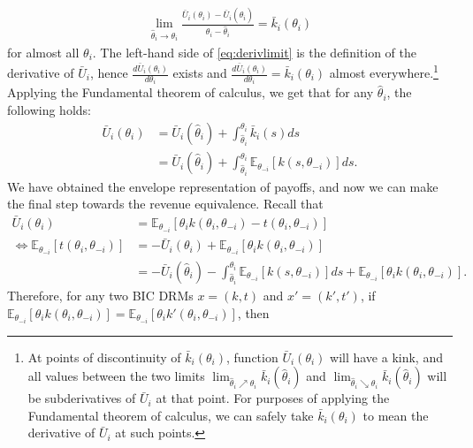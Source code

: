 \documentclass[a4paper]{article}
\begin{document}
	\begin{align}
		\lim_{\hat{\theta}_i \to \theta_i} \frac{\bar{U}_i(\theta_i) - \bar{U}_i(\hat{\theta}_i)}{\theta_i - \hat{\theta}_i} = \bar{k}_i(\theta_i)
		\label{eq:derivlimit}
	\end{align}
	for almost all $\theta_i$.
	The left-hand side of \eqref{eq:derivlimit} is the definition of the derivative of $\bar{U}_i$, hence $\frac{d\bar{U}_i(\theta_i)}{d \theta_i}$ exists and $\frac{d\bar{U}_i(\theta_i)}{d \theta_i} = \bar{k}_i(\theta_i)$ almost everywhere.\footnote{At points of discontinuity of $\bar{k}_i(\theta_i)$, function $\bar{U}_i(\theta_i)$ will have a kink, and all values between the two limits $\lim_{\hat{\theta}_i \nearrow \theta_i} \bar{k}_i(\hat{\theta}_i)$ and $\lim_{\hat{\theta}_i \searrow \theta_i} \bar{k}_i(\hat{\theta}_i)$ will be subderivatives of $\bar{U}_i$ at that point. For purposes of applying the Fundamental theorem of calculus, we can safely take $\bar{k}_i(\theta_i)$ to mean the derivative of $\bar{U}_i$ at such points.}
	Applying the Fundamental theorem of calculus, we get that for any $\hat{\theta}_i$, the following holds:
	\begin{align}
		\bar{U}_i(\theta_i) &= \bar{U}_i(\hat{\theta}_i) + \int_{\hat{\theta}_i}^{\theta_i} \bar{k}_i(s) ds
		\\
		&= \bar{U}_i(\hat{\theta}_i) + \int_{\hat{\theta}_i}^{\theta_i} \mathbb{E}_{\theta_{-i}}\left[ k(s,\theta_{-i}) \right] ds.
	\end{align}
	We have obtained the envelope representation of payoffs, and now we can make the final step towards the revenue equivalence. Recall that
	\begin{align*}
		\bar{U}_i(\theta_i) &= \mathbb{E}_{\theta_{-i}}\left[ \theta_{i} k(\theta_i,\theta_{-i}) - t(\theta_i,\theta_{-i}) \right]
		\\ \Leftrightarrow
		\mathbb{E}_{\theta_{-i}}\left[ t(\theta_i,\theta_{-i}) \right] &= -\bar{U}_i(\theta_i) + \mathbb{E}_{\theta_{-i}}\left[ \theta_{i} k(\theta_i,\theta_{-i}) \right] 
		\\
		&= -\bar{U}_i(\hat{\theta}_i) - \int_{\hat{\theta}_i}^{\theta_i} \mathbb{E}_{\theta_{-i}}\left[ k(s,\theta_{-i}) \right] ds + \mathbb{E}_{\theta_{-i}}\left[ \theta_{i} k(\theta_i,\theta_{-i}) \right] .
	\end{align*}
	Therefore, for any two BIC DRMs $x=(k,t)$ and $x'=(k',t')$, if $\mathbb{E}_{\theta_{-i}}\left[ \theta_{i} k(\theta_i,\theta_{-i}) \right] = \mathbb{E}_{\theta_{-i}}\left[ \theta_{i} k'(\theta_i,\theta_{-i}) \right]$, then 
\end{document}
